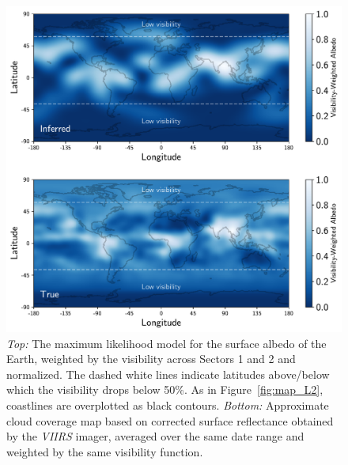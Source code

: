 \documentclass[modern]{aastex62}
\begin{document}
\begin{figure}[p!]
    \begin{centering}
    \includegraphics[width=\linewidth]{figures/map.pdf}
    \caption{\label{fig:map}
             \emph{Top:} The maximum likelihood model for the surface albedo
             of the Earth, weighted by the visibility across Sectors 1 and 2 and
			 normalized. The
             dashed white lines indicate latitudes above/below which the
             visibility drops below 50\%. As in Figure~\ref{fig:map_L2}, coastlines 
             are overplotted as black contours.
             \emph{Bottom:} Approximate cloud coverage map based on corrected
             surface reflectance obtained by the
             \emph{VIIRS} imager, averaged over the same date range and weighted
             by the same visibility function.
             }
    \end{centering}
\end{figure}
\end{document}
